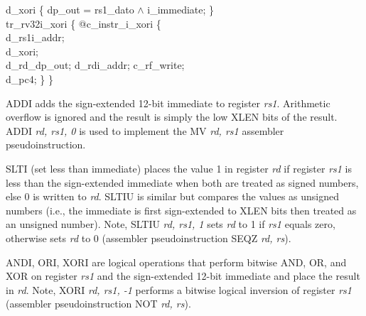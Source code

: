 {%
\indent d\_xori \{ dp\_out = rs1\_dato $\wedge$ i\_immediate; \}\\%
\indent tr\_rv32i\_xori \{ @c\_instr\_i\_xori \{ \\%
\indent \hspace{\parindent} d\_rs1i\_addr; \\%
\indent \hspace{\parindent} d\_xori; \\%
\indent \hspace{\parindent} d\_rd\_dp\_out; d\_rdi\_addr; c\_rf\_write;  \\%
\indent \hspace{\parindent} d\_pc4; \} \} \\%
}

ADDI adds the sign-extended 12-bit immediate to register {\em rs1}.
Arithmetic overflow is ignored and the result is simply the low
XLEN bits of the result.  ADDI {\em rd, rs1, 0} is used to implement the
MV {\em rd, rs1} assembler pseudoinstruction.

SLTI (set less than immediate) places the value 1 in register {\em rd}
if register {\em rs1} is less than the sign-extended immediate when
both are treated as signed numbers, else 0 is written to {\em rd}.
SLTIU is similar but compares the values as unsigned numbers (i.e.,
the immediate is first sign-extended to XLEN bits then treated as an
unsigned number).  Note, SLTIU {\em rd, rs1, 1} sets {\em rd}
to 1 if {\em rs1} equals zero, otherwise sets {\em rd} to 0 (assembler
pseudoinstruction SEQZ {\em rd, rs}).

ANDI, ORI, XORI are logical operations that perform bitwise AND, OR,
and XOR on register {\em rs1} and the sign-extended 12-bit immediate
and place the result in {\em rd}.  Note, XORI {\em rd, rs1, -1}
performs a bitwise logical inversion of register {\em rs1} (assembler
pseudoinstruction NOT {\em rd, rs}).


